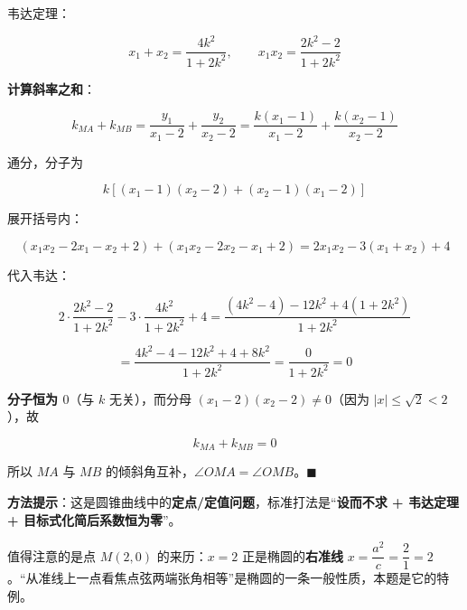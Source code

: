\begin{answer}
韦达定理：

\nopagebreak[4]
\[x_1+x_2=\frac{4k^{2}}{1+2k^{2}},\qquad x_1x_2=\frac{2k^{2}-2}{1+2k^{2}}\]

\textbf{计算斜率之和}：

\nopagebreak[4]
\[k_{MA}+k_{MB}=\frac{y_1}{x_1-2}+\frac{y_2}{x_2-2}=\frac{k\left(x_1-1\right)}{x_1-2}+\frac{k\left(x_2-1\right)}{x_2-2}\]

通分，分子为

\nopagebreak[4]
\[k\left[\left(x_1-1\right)\left(x_2-2\right)+\left(x_2-1\right)\left(x_1-2\right)\right]\]

展开括号内：

\nopagebreak[4]
\[\left(x_1x_2-2x_1-x_2+2\right)+\left(x_1x_2-2x_2-x_1+2\right)=2x_1x_2-3\left(x_1+x_2\right)+4\]

代入韦达：

\nopagebreak[4]
\[2\cdot\frac{2k^{2}-2}{1+2k^{2}}-3\cdot\frac{4k^{2}}{1+2k^{2}}+4=\frac{\left(4k^{2}-4\right)-12k^{2}+4\left(1+2k^{2}\right)}{1+2k^{2}}\]

\nopagebreak[4]
\[=\frac{4k^{2}-4-12k^{2}+4+8k^{2}}{1+2k^{2}}=\frac{0}{1+2k^{2}}=0\]

\textbf{分子恒为 $0$}（与 $k$ 无关），而分母 $\left(x_1-2\right)\left(x_2-2\right)\ne0$（因为 $|x|\le\sqrt2<2$），故

\nopagebreak[4]
\[k_{MA}+k_{MB}=0\]

所以 $MA$ 与 $MB$ 的倾斜角互补，$\angle OMA=\angle OMB$。$\blacksquare$

\begin{gktip}
\textbf{方法提示}：这是圆锥曲线中的\textbf{定点/定值问题}，标准打法是“\textbf{设而不求 + 韦达定理 + 目标式化简后系数恒为零}”。

值得注意的是点 $M(2,0)$ 的来历：$x=2$ 正是椭圆的\textbf{右准线} $x=\dfrac{a^{2}}c=\dfrac21=2$。“从准线上一点看焦点弦两端张角相等”是椭圆的一条一般性质，本题是它的特例。
\end{gktip}

\par\medskip

\Needspace{0.5\textheight}



\end{answer}
